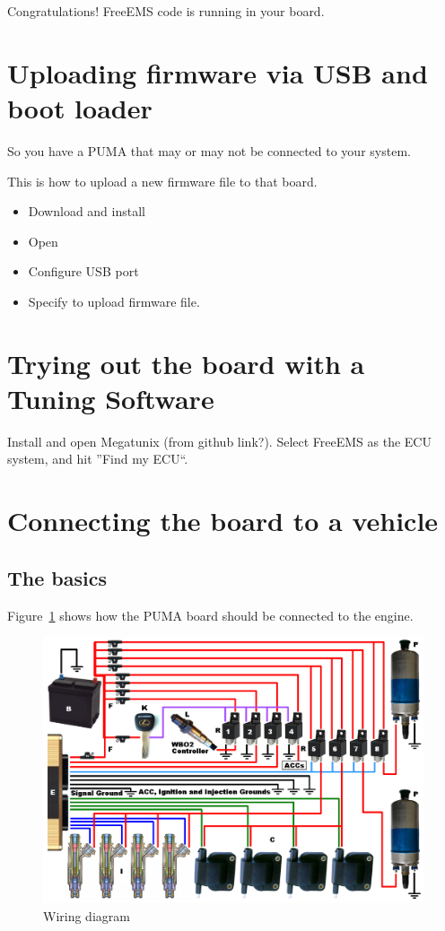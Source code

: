 \documentclass[12pt,a4paper,titlepage]{article}
\begin{document}
Congratulations! FreeEMS code is running in your board.

\section{Uploading firmware via USB and boot loader}

So you have a PUMA that may or may not be connected to your system.

This is how to upload a new firmware file to that board.

\begin{itemize}
\item Download and install

\item Open

\item Configure USB port

\item Specify to upload firmware file.
\end{itemize}


\section{Trying out the board with a Tuning Software}

Install and open Megatunix (from github link?). Select FreeEMS as the ECU system, and hit ''Find my ECU``.



\section{Connecting the board to a vehicle}

\subsection{The basics}
Figure~\ref{fig:wiring} shows how the PUMA board should be connected to the engine.

\begin{figure}[h!]
\begin{center}
\includegraphics[width=1\textwidth]{images/freeems-power-wiring5.png}
\caption{Wiring diagram}
\label{fig:wiring}
\end{center}
\end{figure}
\end{document}
